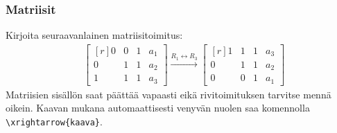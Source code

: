 \begin{frame}[fragile]
    \frametitle{Matriisit}
    \begin{harj}
        Kirjoita seuraavanlainen matriisitoimitus: 
        \begin{align*}
            &
            \begin{bmatrix*}[r]
                0 & 0 & 1 & a_1\\
                0 & 1 & 1 & a_2\\
                1 & 1 & 1 & a_3
            \end{bmatrix*}
        \xrightarrow{R_1\leftrightarrow R_3}
            \begin{bmatrix*}[r]
                1 & 1 & 1 & a_3\\
                0 & 1 & 1 & a_2\\
                0 & 0 & 1 & a_1
            \end{bmatrix*}
        \end{align*}
        Matriisien sisällön saat päättää vapaasti eikä rivitoimituksen tarvitse mennä oikein. %
        Kaavan mukana automaattisesti venyvän nuolen saa komennolla \verb-\xrightarrow{kaava}-.

    \end{harj}
\end{frame}
